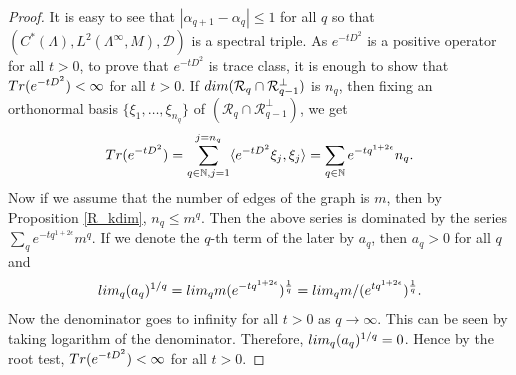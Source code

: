\documentclass{amsart}
\theoremstyle{plain}
\theoremstyle{definition}
\theoremstyle{remark}
\numberwithin{equation}{section}
\newcommand{\cal}{\mathcal}
\newcommand{\cld}{{\cal D}}
\newcommand{\clr}{{\cal R}}
\newcommand{\raro}{\rightarrow}
\begin{document}
\begin{proof}
 It is easy to see that $|\alpha_{q+1}-\alpha_{q}|\leq 1$ for all $q$ so that $(C^{\ast}(\Lambda),L^{2}(\Lambda^{\infty},M),\cld)$ is a spectral triple. As $e^{-tD^2}$ is a positive operator for all $t>0$, to prove that $e^{-tD^2}$ is trace class, it is enough to show that ${\rm Tr}(e^{-tD^2})<\infty$ for all $t>0$. If ${\rm dim}(\clr_{q}\cap \clr_{q-1}^{\perp})$ is $n_{q}$, then fixing an orthonormal basis $\{\xi_{1},\ldots,\xi_{n_{q}}\}$ of $(\clr_{q}\cap \clr_{q-1}^{\perp})$, we get
 \begin{equation*}
     {\rm Tr}(e^{-tD^2})=\sum_{q\in\mathbb{N},j=1}^{j=n_{q}}\langle e^{-tD^2}\xi_{j},\xi_{j}\rangle\\
    = \sum_{q\in\mathbb{N}}e^{-tq^{1+2\epsilon}}n_{q}.
 \end{equation*}
 Now if we assume that the number of edges of the graph is $m$, then by Proposition \ref{R_kdim}, $n_{q}\leq m^q$. Then the above series is dominated by the series $\sum_{q}e^{-tq^{1+2\epsilon}}m^{q}$. If we denote the $q$-th term of the later by $a_{q}$, then $a_{q}>0$ for all $q$ and 
 \begin{equation*}
     {\rm lim}_{q}(a_{q})^{1/q}={\rm lim}_{q}m(e^{-tq^{1+2\epsilon}})^{\frac{1}{q}}={\rm lim}_{q}m/(e^{tq^{1+2\epsilon}})^{\frac{1}{q}}.
 \end{equation*} Now the denominator goes to infinity for all $t>0$ as $q\raro\infty$. This can be seen by taking logarithm of the denominator. Therefore, ${\rm lim}_{q}(a_{q})^{1/q}=0$. Hence by the root test, ${\rm Tr}(e^{-tD^2})<\infty$ for all $t>0$.\end{proof}
\end{document}
